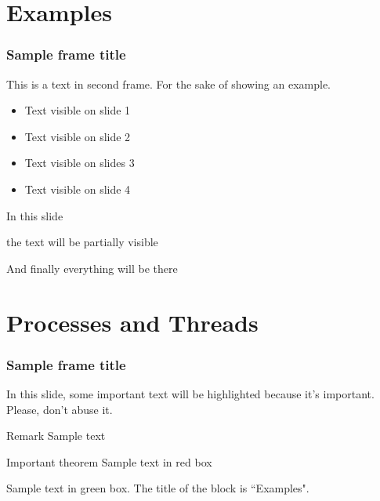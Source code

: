 \section{Examples}

\begin{frame}
    \frametitle{Sample frame title}
    This is a text in second frame. For the sake of showing an example.
    
    \begin{itemize}
        \item<1-> Text visible on slide 1
        \item<2-> Text visible on slide 2
        \item<3> Text visible on slides 3
        \item<4-> Text visible on slide 4
    \end{itemize}
    \end{frame}
    
    
    
    \begin{frame}
    In this slide \pause
    
    the text will be partially visible \pause
    
    And finally everything will be there
    \end{frame}
    
    \section{Processes and Threads}
    
    \begin{frame}
    \frametitle{Sample frame title}
    
    In this slide, some important text will be
    \alert{highlighted} because it's important.
    Please, don't abuse it.
    
    \begin{block}{Remark}
    Sample text
    \end{block}
    
    \begin{alertblock}{Important theorem}
    Sample text in red box
    \end{alertblock}
    
    \begin{examples}
    Sample text in green box. The title of the block is ``Examples".
    \end{examples}
    \end{frame}
    
